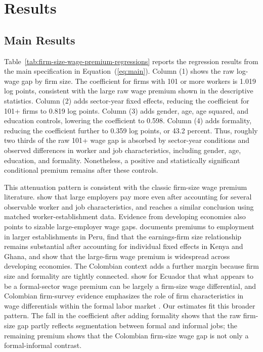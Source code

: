 \section{Results}

\subsection{Main Results}

Table~\ref{tab:firm-size-wage-premium-regressions} reports the regression results from the main specification in Equation~(\ref{eq:main}). Column (1) shows the raw log-wage gap by firm size. The coefficient for firms with 101 or more workers is 1.019 log points, consistent with the large raw wage premium shown in the descriptive statistics. Column (2) adds sector-year fixed effects, reducing the coefficient for 101+ firms to 0.819 log points. Column (3) adds gender, age, age squared, and education controls, lowering the coefficient to 0.598. Column (4) adds formality, reducing the coefficient further to 0.359 log points, or 43.2 percent. Thus, roughly two thirds of the raw 101+ wage gap is absorbed by sector-year conditions and observed differences in worker and job characteristics, including gender, age, education, and formality. Nonetheless, a positive and statistically significant conditional premium remains after these controls.



This attenuation pattern is consistent with the classic firm-size wage premium literature. \citet{BrownMedoff1989} show that large employers pay more even after accounting for several observable worker and job characteristics, and \citet{troske1999evidence} reaches a similar conclusion using matched worker-establishment data. Evidence from developing economies also points to sizable large-employer wage gaps. \citet{Schaffner1998} documents premiums to employment in larger establishments in Peru, \citet{SoderbomTealWambugu2005} find that the earnings-firm size relationship remains substantial after accounting for individual fixed effects in Kenya and Ghana, and \citet{reed2019large} show that the large-firm wage premium is widespread across developing economies. The Colombian context adds a further margin because firm size and formality are tightly connected. \citet{ElBadaouiStroblWalsh2010} show for Ecuador that what appears to be a formal-sector wage premium can be largely a firm-size wage differential, and Colombian firm-survey evidence emphasizes the role of firm characteristics in wage differentials within the formal labor market \citep{iregui2012diferenciales}. Our estimates fit this broader pattern. The fall in the coefficient after adding formality shows that the raw firm-size gap partly reflects segmentation between formal and informal jobs; the remaining premium shows that the Colombian firm-size wage gap is not only a formal-informal contrast.

